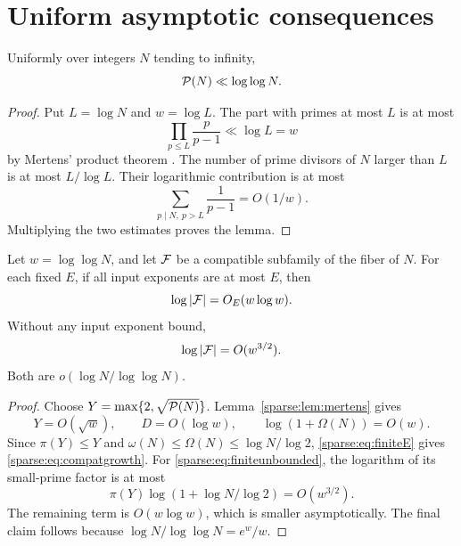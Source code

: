 \section{Uniform asymptotic consequences}
\begin{lemma}\label{sparse:lem:mertens}
Uniformly over integers $N$ tending to infinity,
\[
 \mathcal P(N)\ll\log\log N.
\]
\end{lemma}
\begin{proof}
Put $L=\log N$ and $w=\log L$. The part with primes at most $L$ is at most
\[
 \prod_{p\le L}\frac p{p-1}\ll\log L=w
\]
by Mertens' product theorem \cite{mertens}. The number of prime divisors of $N$ larger than $L$ is at most $L/\log L$. Their logarithmic contribution is at most
\[
 \sum_{p\mid N,\ p>L}\frac1{p-1}=O(1/w).
\]
Multiplying the two estimates proves the lemma.
\end{proof}

\begin{corollary}\label{sparse:cor:compatible}
Let $w=\log\log N$, and let $\mathcal F$ be a compatible subfamily of the fiber of $N$.
For each fixed $E$, if all input exponents are at most $E$, then
\begin{equation}\label{sparse:eq:compatgrowth}
 \log|\mathcal F|=O_E(w\log w).
\end{equation}
Without any input exponent bound,
\[
 \log|\mathcal F|=O(w^{3/2}).
\]
Both are $o(\log N/\log\log N)$.
\end{corollary}
\begin{proof}
Choose $Y=\max\{2,\sqrt{\mathcal P(N)}\}$. Lemma~\ref{sparse:lem:mertens} gives
\[
 Y=O(\sqrt w),\qquad D=O(\log w),\qquad
 \log(1+\Omega(N))=O(w).
\]
Since $\pi(Y)\le Y$ and $\omega(N)\le\Omega(N)\le\log N/\log2$, \eqref{sparse:eq:finiteE} gives \eqref{sparse:eq:compatgrowth}. For \eqref{sparse:eq:finiteunbounded}, the logarithm of its small-prime factor is at most
\[
 \pi(Y)\log(1+\log N/\log2)=O(w^{3/2}).
\]
The remaining term is $O(w\log w)$, which is smaller asymptotically. The final claim follows because $\log N/\log\log N=e^w/w$.
\end{proof}

